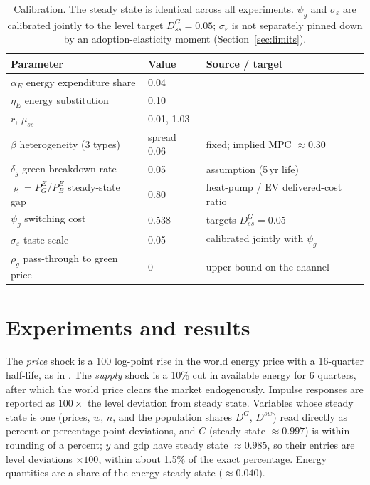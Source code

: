 \documentclass[11pt,a4paper]{article}
\begin{document}
\begin{table}[H]\centering
\small
\begin{tabular}{lll}
\toprule
Parameter & Value & Source / target \\
\midrule
$\alpha_E$ energy expenditure share & 0.04 & \citet{ARS2024} \\
$\eta_E$ energy substitution & 0.10 & \citet{ARS2024} \\
$r$, $\mu_{ss}$ & 0.01, 1.03 & \citet{ARS2024} \\
$\beta$ heterogeneity (3 types) & spread 0.06 & fixed; implied MPC $\approx0.30$ \\
\midrule
$\delta_g$ green breakdown rate & 0.05 & assumption (5\,yr life) \\
$\varrho=P^{E}_{G}/P^{E}_{B}$ steady-state gap & 0.80 & heat-pump / EV delivered-cost ratio \\
$\psi_g$ switching cost & 0.538 & targets $D^{G}_{ss}=0.05$ \\
$\sigma_{\varepsilon}$ taste scale & 0.05 & calibrated jointly with $\psi_g$ \\
$\rho_g$ pass-through to green price & 0 & upper bound on the channel \\
\bottomrule
\end{tabular}
\caption{Calibration. The steady state is identical across all experiments.
$\psi_g$ and $\sigma_\varepsilon$ are calibrated jointly to the level target
$D^{G}_{ss}=0.05$; $\sigma_\varepsilon$ is not separately pinned down by an
adoption-elasticity moment (Section~\ref{sec:limits}).}
\end{table}



\section{Experiments and results}

The \emph{price} shock is a 100 log-point rise in the world energy price with
a 16-quarter half-life, as in \citet{ARS2024}. The \emph{supply} shock is a 10\%
cut in available energy for 6 quarters, after which the world price clears
the market endogenously. Impulse responses are reported as $100\times$ the
level deviation from steady state. Variables whose steady state is one (prices,
$w$, $n$, and the population shares $D^{G}$, $D^{sw}$) read directly as percent
or percentage-point deviations, and $C$ (steady state $\approx0.997$) is within
rounding of a percent; $y$ and $\mathrm{gdp}$ have steady state
$\approx0.985$, so their entries are level deviations $\times100$, within about
1.5\% of the exact percentage. Energy quantities are a share of the energy
steady state ($\approx0.040$).
\end{document}

